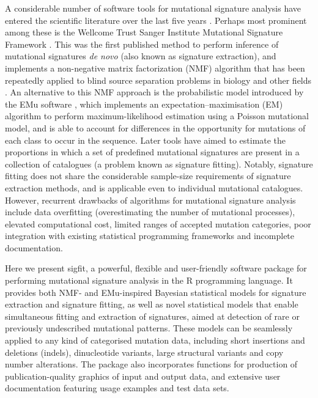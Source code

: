 A considerable number of software tools for mutational signature analysis have entered the scientific literature over the last five years \cite{Baez-Ortega2017}. Perhaps most prominent among these is the Wellcome Trust Sanger Institute Mutational Signature Framework \cite{AlexandrovCellRep2013}. This was the first published method to perform inference of mutational signatures \textit{de novo} (also known as signature extraction), and implements a non-negative matrix factorization (NMF) algorithm that has been repeatedly applied to blind source separation problems in biology and other fields \cite{Devarajan2008}. An alternative to this NMF approach is the probabilistic model introduced by the EMu software \cite{Fischer2013}, which implements an expectation–maximisation (EM) algorithm to perform maximum-likelihood estimation using a Poisson mutational model, and is able to account for differences in the opportunity for mutations of each class to occur in the sequence. Later tools have aimed to estimate the proportions in which a set of predefined mutational signatures are present in a collection of catalogues (a problem known as signature fitting). Notably, signature fitting does not share the considerable sample-size requirements of signature extraction methods, and is applicable even to individual mutational catalogues. However, recurrent drawbacks of algorithms for mutational signature analysis include data overfitting (overestimating the number of mutational processes), elevated computational cost, limited ranges of accepted mutation categories, poor integration with existing statistical programming frameworks and incomplete documentation.

Here we present sigfit, a powerful, flexible and user-friendly software package for performing mutational signature analysis in the R programming language. It provides both NMF- and EMu-inspired Bayesian statistical models for signature extraction and signature fitting, as well as novel statistical models that enable simultaneous fitting and extraction of signatures, aimed at detection of rare or previously undescribed mutational patterns. These models can be seamlessly applied to any kind of categorised mutation data, including short insertions and deletions (indels), dinucleotide variants, large structural variants and copy number alterations. The package also incorporates functions for production of publication-quality graphics of input and output data, and extensive user documentation featuring usage examples and test data sets.
    